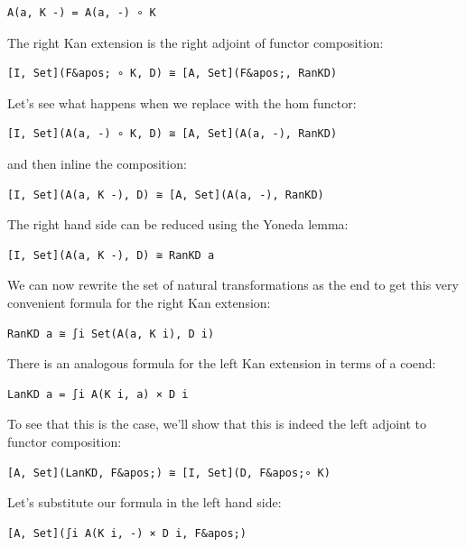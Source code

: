 \begin{verbatim}
A(a, K -) = A(a, -) ∘ K
\end{verbatim}

The right Kan extension is the right adjoint of functor composition:

\begin{verbatim}
[I, Set](F&apos; ∘ K, D) ≅ [A, Set](F&apos;, RanKD)
\end{verbatim}

Let's see what happens when we replace  with the hom
functor:

\begin{verbatim}
[I, Set](A(a, -) ∘ K, D) ≅ [A, Set](A(a, -), RanKD)
\end{verbatim}

and then inline the composition:

\begin{verbatim}
[I, Set](A(a, K -), D) ≅ [A, Set](A(a, -), RanKD)
\end{verbatim}

The right hand side can be reduced using the Yoneda lemma:

\begin{verbatim}
[I, Set](A(a, K -), D) ≅ RanKD a
\end{verbatim}

We can now rewrite the set of natural transformations as the end to get
this very convenient formula for the right Kan extension:

\begin{verbatim}
RanKD a ≅ ∫i Set(A(a, K i), D i)
\end{verbatim}

There is an analogous formula for the left Kan extension in terms of a
coend:

\begin{verbatim}
LanKD a = ∫i A(K i, a) × D i
\end{verbatim}

To see that this is the case, we'll show that this is indeed the left
adjoint to functor composition:

\begin{verbatim}
[A, Set](LanKD, F&apos;) ≅ [I, Set](D, F&apos;∘ K)
\end{verbatim}

Let's substitute our formula in the left hand side:

\begin{verbatim}
[A, Set](∫i A(K i, -) × D i, F&apos;)
\end{verbatim}

